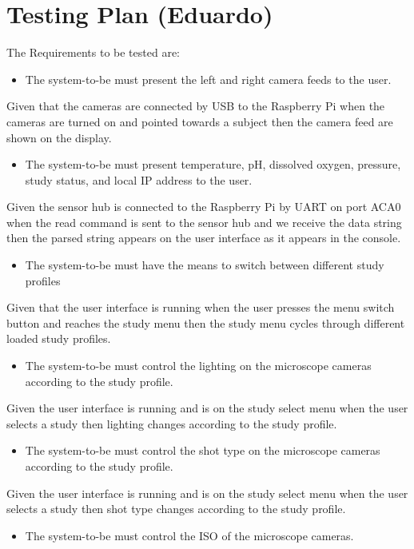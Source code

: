 \section{Testing Plan (Eduardo)}
The Requirements to be tested are:
\begin{itemize}
    \item The system-to-be must present the left and right camera feeds to the user.
\end{itemize}
Given that the cameras are connected by USB to the Raspberry Pi when the cameras are turned on and pointed towards a subject then the camera feed are shown on the display.
\begin{itemize}
    \item The system-to-be must present temperature, pH, dissolved oxygen, pressure, study status, and local IP address to the user.
\end{itemize}
Given the sensor hub is connected to the Raspberry Pi by UART on port ACA0 when the read command is sent to the sensor hub and we receive the data string then the parsed string appears on the user interface as it appears in the console.
\begin{itemize}
    \item The system-to-be must have the means to switch between different study profiles
\end{itemize}
Given that the user interface is running when the user presses the menu switch button and reaches the study menu then the study menu cycles through different loaded study profiles.
\begin{itemize}
    \item The system-to-be must control the lighting on the microscope cameras according to the study profile.
\end{itemize}
Given the user interface is running and is on the study select menu when the user selects a study then lighting changes according to the study profile.
\begin{itemize}
    \item The system-to-be must control the shot type on the microscope cameras according to the study profile.
\end{itemize}
Given the user interface is running and is on the study select menu when the user selects a study then  shot type changes according to the study profile.
\begin{itemize}
    \item The system-to-be must control the ISO of the microscope cameras.
\end{itemize}
